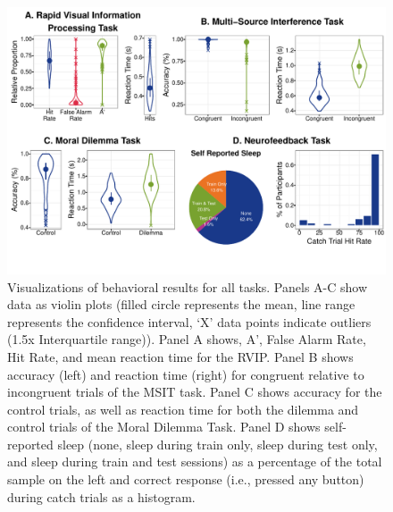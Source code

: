 \begin{figure}[h!]
   \centering
   \includegraphics[width=.9\textwidth]{bxplots.pdf}
   \caption{Visualizations of behavioral results for all tasks. Panels A-C show data as violin plots (filled circle represents the mean, line range represents the confidence interval, ‘X’ data points indicate outliers (1.5x Interquartile range)). Panel A shows, A’, False Alarm Rate, Hit Rate, and mean reaction time for the RVIP. Panel B shows accuracy (left) and reaction time (right) for congruent relative to incongruent trials of the MSIT task. Panel C shows accuracy for the control trials, as well as reaction time for both the dilemma and control trials of the Moral Dilemma Task. Panel D shows self-reported sleep (none, sleep during train only, sleep during test only, and sleep during train and test sessions) as a percentage of the total sample on the left and correct response (i.e., pressed any button) during catch trials as a histogram.}
   \label{fig:bx_plots}
\end{figure}


